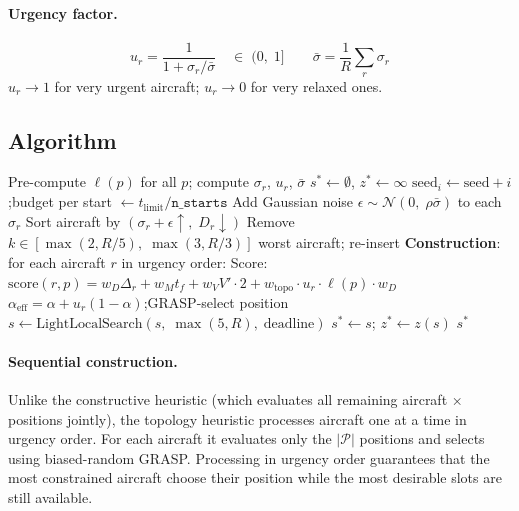 \paragraph{Urgency factor.}
\[
    u_r = \frac{1}{1 + \sigma_r / \bar{\sigma}}
    \quad\in\;(0,\;1]
    \qquad \bar{\sigma} = \frac{1}{R}\sum_{r}\sigma_r
\]
$u_r \to 1$ for very urgent aircraft; $u_r \to 0$ for very relaxed ones.

\subsection{Algorithm}

\begin{algorithm}[H]
\caption{Topology-Aware Heuristic (multi-start)}
\begin{algorithmic}[1]
\State Pre-compute $\ell(p)$ for all $p$; compute $\sigma_r$, $u_r$, $\bar{\sigma}$ 
\State $s^* \leftarrow \emptyset$, $z^* \leftarrow \infty$
    \State $\text{seed}_i \leftarrow \text{seed} + i$;\quad budget per start $\leftarrow t_{\text{limit}} / \texttt{n\_starts}$
        \State Add Gaussian noise $\epsilon \sim \mathcal{N}(0,\;\rho\bar{\sigma})$ to each $\sigma_r$ 
        \State Sort aircraft by $(\sigma_r + \epsilon \uparrow,\; D_r \downarrow)$ 
            \State Remove $k \in [\max(2, R/5),\; \max(3, R/3)]$ worst aircraft; re-insert
        \Else
            \State \textbf{Construction}: for each aircraft $r$ in urgency order:
            \State \quad Score: $\text{score}(r,p) = w_D \Delta_r + w_M t_f + w_V V' \cdot 2 + w_{\text{topo}} \cdot u_r \cdot \ell(p) \cdot w_D$
            \State \quad $\alpha_{\text{eff}} = \alpha + u_r(1 - \alpha)$;\quad GRASP-select position
        \EndIf
        \State $s \leftarrow \text{LightLocalSearch}(s,\;\max(5,R),\;\text{deadline})$
         \; $s^* \leftarrow s$; $z^* \leftarrow z(s)$ \EndIf
    \EndWhile
\EndFor
\State \Return $s^*$
\end{algorithmic}
\end{algorithm}

\paragraph{Sequential construction.}
Unlike the constructive heuristic (which evaluates all remaining aircraft ×
positions jointly), the topology heuristic processes aircraft one at a time in
urgency order.  For each aircraft it evaluates only the $|\mathcal{P}|$
positions and selects using biased-random GRASP.  Processing in urgency order
guarantees that the most constrained aircraft choose their position while the
most desirable slots are still available.

